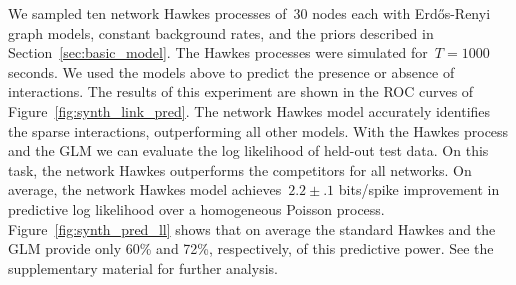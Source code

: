 We sampled ten network Hawkes processes of~$30$ nodes each with Erd\H{o}s-Renyi graph models, constant background rates, and the priors described in Section~\ref{sec:basic_model}. The Hawkes processes were simulated for~${T=1000}$ seconds. We used the models above to predict the presence or absence of interactions. The results of this experiment are shown in the ROC curves of Figure~\ref{fig:synth_link_pred}. The network Hawkes model accurately identifies the sparse interactions, outperforming all other models.
With the Hawkes process and the GLM we can evaluate the log likelihood of held-out test data. On this task, the network Hawkes outperforms the competitors for all networks. On average, the network Hawkes model achieves~$2.2\pm.1$ bits/spike improvement in predictive log likelihood over a homogeneous Poisson process. Figure~\ref{fig:synth_pred_ll} shows that on average the standard Hawkes and the GLM provide only 60\% and 72\%, respectively, of this predictive power. See the supplementary material for further analysis.

